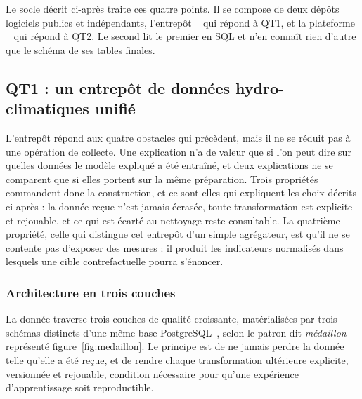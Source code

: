 Le socle décrit ci-après traite ces quatre points. Il se compose de deux dépôts logiciels publics et indépendants, l'entrepôt \hubeaudepot~\cite{depot_entrepot} qui répond à QT1, et la plateforme \plateforme~\cite{depot_plateforme} qui répond à QT2. Le second lit le premier en SQL et n'en connaît rien d'autre que le schéma de ses tables finales.

\subsection{QT1 : un entrepôt de données hydro-climatiques unifié}

L'entrepôt répond aux quatre obstacles qui précèdent, mais il ne se réduit pas à une opération de
collecte. Une explication n'a de valeur que si l'on peut dire sur quelles données le modèle
expliqué a été entraîné, et deux explications ne se comparent que si elles portent sur la même
préparation. Trois propriétés commandent donc la construction, et ce sont elles qui expliquent les
choix décrits ci-après : la donnée reçue n'est jamais écrasée, toute transformation est
explicite et rejouable, et ce qui est écarté au nettoyage reste consultable. La quatrième
propriété, celle qui distingue cet entrepôt d'un simple agrégateur, est qu'il ne se contente pas
d'exposer des mesures : il produit les indicateurs normalisés dans lesquels une cible
contrefactuelle pourra s'énoncer.

\subsubsection{Architecture en trois couches}

La donnée traverse trois couches de qualité croissante, matérialisées par trois schémas distincts d'une même base PostgreSQL~\cite{postgresql}, selon le patron dit \emph{médaillon} représenté figure~\ref{fig:medaillon}. Le principe est de ne jamais perdre la donnée telle qu'elle a été reçue, et de rendre chaque transformation ultérieure explicite, versionnée et rejouable, condition nécessaire pour qu'une expérience d'apprentissage soit reproductible.

